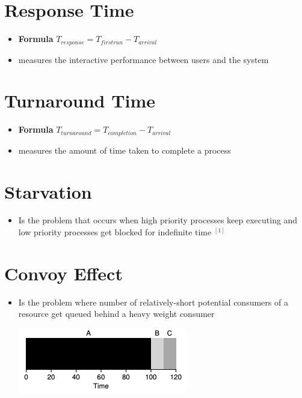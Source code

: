 \documentclass[12pt]{article}
\begin{document}
\section{Response Time}
\begin{itemize}
    \item \textbf{Formula} $T_{response} = T_{firstrun} - T_{arrival}$
    \item measures the interactive performance between users and the system
\end{itemize}

\section{Turnaround Time}

\begin{itemize}
    \item \textbf{Formula} $T_{turnaround} = T_{completion} - T_{arrival}$
    \item measures the amount of time taken to complete a process
\end{itemize}

\section{Starvation}

\begin{itemize}
    \item Is the problem that occurs when high priority processes keep
    executing and low priority processes get blocked for indefinite time $^{[1]}$
\end{itemize}

\section{Convoy Effect}

\begin{itemize}
    \item Is the problem where number of relatively-short potential consumers
    of a resource get queued behind a heavy weight consumer

    \bigskip

    \begin{center}
    \includegraphics[width=0.7\linewidth]{images/midterm_2_solution_5.png}
    \end{center}
\end{itemize}
\end{document}
